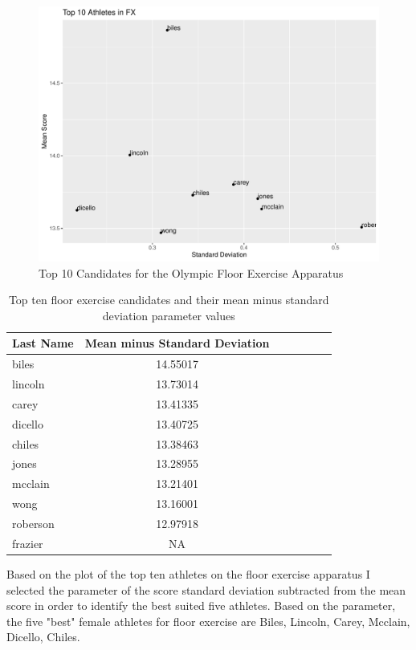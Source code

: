 \documentclass[12pt]{article}
\begin{document}
\begin{figure}[tbp]
  \centering
  \includegraphics[scale=0.6]{Top10AthletesFX.pdf}
  \caption{Top 10 Candidates for the Olympic Floor Exercise Apparatus}
  \label{fig:FX}
\end{figure}

\begin{table}[tbp]
  \caption{Top ten floor exercise candidates and their mean minus standard deviation parameter values}
  \label{tab:tableFXP}
\centering
\begin{tabular}[t]{lccllll}
 \toprule
Last Name & Mean minus Standard Deviation\\
\midrule
biles & 14.55017\\
\midrule
lincoln & 13.73014\\
\midrule
carey & 13.41335\\
\midrule
dicello & 13.40725\\
\midrule
chiles & 13.38463\\
\midrule
jones & 13.28955\\
\midrule
mcclain & 13.21401\\
\midrule
wong & 13.16001\\
\midrule
roberson & 12.97918\\
\midrule
frazier & NA\\
\bottomrule
\end{tabular}
\end{table}

Based on the plot of the top ten athletes on the floor exercise apparatus I selected the parameter of 
the score standard deviation subtracted from the mean score in order to identify the best suited five 
athletes. Based on the parameter, the five "best" female athletes for floor exercise are Biles, Lincoln, Carey, 
Mcclain, Dicello, Chiles.
\end{document}
